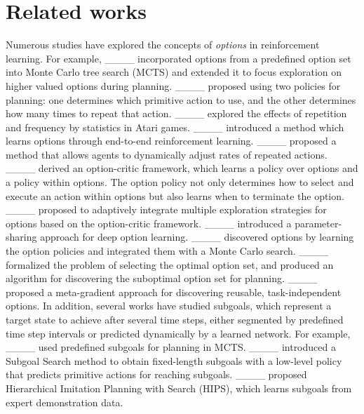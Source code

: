 \section{Related works}
Numerous studies have explored the concepts of \textit{options} in reinforcement learning.
For example, ____ incorporated options from a predefined option set into Monte Carlo tree search (MCTS) and extended it to focus exploration on higher valued options during planning.
____ proposed using two policies for planning: one determines which primitive action to use, and the other determines how many times to repeat that action.
____ explored the effects of repetition and frequency by statistics in Atari games.
____ introduced a method which learns options through end-to-end reinforcement learning.
____ proposed a method that allows agents to dynamically adjust rates of repeated actions.
____ derived an option-critic framework, which learns a policy over options and a policy within options.
The option policy not only determines how to select and execute an action within options but also learns when to terminate the option.
____ proposed to adaptively integrate multiple exploration strategies for options based on the option-critic framework.
____ introduced a parameter-sharing approach for deep option learning.
____ discovered options by learning the option policies and integrated them with a Monte Carlo search.
____ formalized the problem of selecting the optimal option set, and produced an algorithm for discovering the suboptimal option set for planning.
____ proposed a meta-gradient approach for discovering reusable, task-independent options.
In addition, several works have studied subgoals, which represent a target state to achieve after several time steps, either segmented by predefined time step intervals or predicted dynamically by a learned network.
For example, ____ used predefined subgoals for planning in MCTS.
____ introduced a Subgoal Search method to obtain fixed-length subgoals with a low-level policy that predicts primitive actions for reaching subgoals.
____ proposed Hierarchical Imitation Planning with Search (HIPS), which learns subgoals from expert demonstration data.
